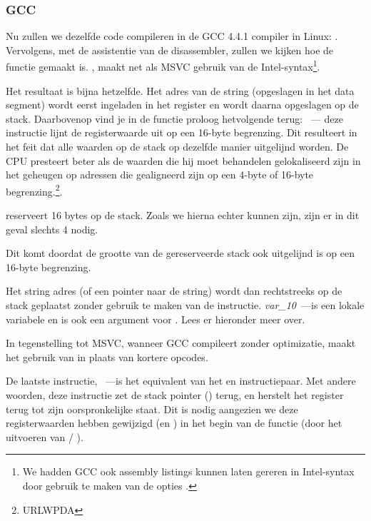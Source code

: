 \subsubsection{GCC}

Nu zullen we dezelfde \CCpp code compileren in de GCC 4.4.1 compiler in Linux: .
Vervolgens, met de assistentie van de \IDA disassembler, zullen we kijken hoe de \main functie gemaakt is.
\IDA, maakt net als MSVC gebruik van de Intel-syntax\footnote{We hadden GCC ook assembly listings kunnen laten gereren in Intel-syntax door gebruik te maken van de opties .}.



Het resultaat is bijna hetzelfde.
Het adres van de  string (opgeslagen in het data segment) wordt eerst ingeladen in het \EAX register en wordt daarna opgeslagen op de stack.
Daarbovenop vind je in de functie proloog hetvolgende terug: ~---
deze instructie lijnt de \ESP registerwaarde uit op een 16-byte begrenzing.
Dit resulteert in het feit dat alle waarden op de stack op dezelfde manier uitgelijnd worden.
De CPU presteert beter als de waarden die hij moet behandelen gelokaliseerd zijn in het geheugen op adressen die gealigneerd zijn op een 4-byte of 16-byte begrenzing.\footnote{URLWPDA}.

 reserveert 16 bytes op de stack. Zoals we hierna echter kunnen zijn, zijn er in dit geval slechts 4 nodig.

Dit komt doordat de grootte van de gereserveerde stack ook uitgelijnd is op een 16-byte begrenzing.

Het string adres (of een pointer naar de string) wordt dan rechtstreeks op de stack geplaatst zonder gebruik te maken van de \PUSH instructie.
\emph{var\_10}~---is een lokale variabele en is ook een argument voor \printf{}.
Lees er hieronder meer over.

\NLph{}

In tegenstelling tot MSVC, wanneer GCC compileert zonder optimizatie, maakt het gebruik van  in plaats van kortere opcodes.

De laatste instructie, \LEAVE~---is het equivalent van het  en  instructiepaar.
Met andere woorden, deze instructie zet de \gls{stack pointer} (\ESP) terug, en herstelt het \EBP register
terug tot zijn oorspronkelijke staat.
Dit is nodig aangezien we deze registerwaarden hebben gewijzigd (\ESP en \EBP) in het begin van de functie (door het uitvoeren van  / ).

